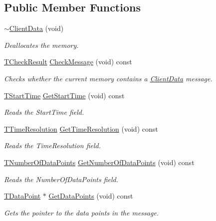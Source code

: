 \subsection*{Public Member Functions}
\begin{DoxyCompactItemize}
\item 
\hyperlink{class_terra_swarm_1_1_asynchronous_1_1_client_data_a7ef007db6436f43f2fa6b503e3ad690e}{$\sim$\-Client\-Data} (void)
\begin{DoxyCompactList}\small\item\em Deallocates the memory. \end{DoxyCompactList}\item 
\hyperlink{class_terra_swarm_1_1_asynchronous_1_1_client_data_a91575e9105c574792d5216d40f1c89de}{T\-Check\-Result} \hyperlink{class_terra_swarm_1_1_asynchronous_1_1_client_data_a6d290292eacc3416e00da93b3f79d8c3}{Check\-Message} (void) const 
\begin{DoxyCompactList}\small\item\em Checks whether the current memory contains a \hyperlink{class_terra_swarm_1_1_asynchronous_1_1_client_data}{Client\-Data} message. \end{DoxyCompactList}\item 
\hyperlink{class_terra_swarm_1_1_asynchronous_1_1_client_data_a70b07646d3a13d9c2cb16ade44a49966}{T\-Start\-Time} \hyperlink{class_terra_swarm_1_1_asynchronous_1_1_client_data_af78cac737c5197ad17205bab73421b60}{Get\-Start\-Time} (void) const 
\begin{DoxyCompactList}\small\item\em Reads the Start\-Time field. \end{DoxyCompactList}\item 
\hyperlink{class_terra_swarm_1_1_asynchronous_1_1_client_data_a626a7d114c405bceb24262253fe36c71}{T\-Time\-Resolution} \hyperlink{class_terra_swarm_1_1_asynchronous_1_1_client_data_a6e3ca8aab58e0b40867eee3e3ec281e6}{Get\-Time\-Resolution} (void) const 
\begin{DoxyCompactList}\small\item\em Reads the Time\-Resolution field. \end{DoxyCompactList}\item 
\hyperlink{class_terra_swarm_1_1_asynchronous_1_1_client_data_a690994afd0ba9b8eeb56ae679a5c64e8}{T\-Number\-Of\-Data\-Points} \hyperlink{class_terra_swarm_1_1_asynchronous_1_1_client_data_aba73075c35dd912dad8f99dd026b0785}{Get\-Number\-Of\-Data\-Points} (void) const 
\begin{DoxyCompactList}\small\item\em Reads the Number\-Of\-Data\-Points field. \end{DoxyCompactList}\item 
\hyperlink{class_terra_swarm_1_1_asynchronous_1_1_client_data_ac733720fed15e940f991de44f1bb514e}{T\-Data\-Point} $\ast$ \hyperlink{class_terra_swarm_1_1_asynchronous_1_1_client_data_a72ed5a08a0bbe088b3b6f4d79cdbab2d}{Get\-Data\-Points} (void) const 
\begin{DoxyCompactList}\small\item\em Gets the pointer to the data points in the message. \end{DoxyCompactList}\end{DoxyCompactItemize}

